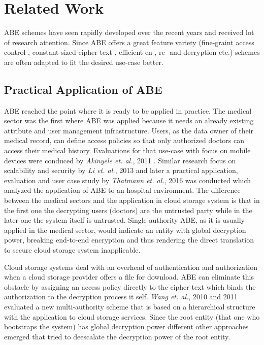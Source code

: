 \chapter{Related Work}
ABE schemes have seen rapidly developed over the recent years and received lot of research attention. Since ABE offers a great feature variety (fine-graint access control \cite{goyal2006attribute}, constant sized cipher-text \cite{li2017two}, efficient en-, re- and decryption \cite{yang2013dac} etc.) schemes are often adapted to fit the desired use-case better. 

\section{Practical Application of ABE}
ABE reached the point where it is ready to be applied in practice. The medical sector was the first where ABE was applied because it needs an already existing attribute and user management infrastructure. Users, as the data owner of their medical record, can define access policies so that only authorized doctors can access their medical history. Evaluations for that use-case with focus on mobile devices were conduced by \textit{Akinyele et. al.}, 2011 \cite{akinyele2011securing}. Similar research focus on scalability and security by \textit{Li et. al.}, 2013 \cite{li2013scalable} and later a practical application, evaluation and user case study by \textit{Thatmann et. al.}, 2016 \cite{thatmann2016please} was conducted which analyzed the application of ABE to an hospital environment. The difference between the medical sectors and the application in cloud storage system is that in the first one the decrypting users (doctors) are the untrusted party while in the later one the system itself is untrusted. Single authority ABE, as it is usually applied in the medical sector, would indicate an entity with global decryption power, breaking end-to-end encryption and thus rendering the direct translation to secure cloud storage system inapplicable.   

Cloud storage systems deal with an overhead of authentication and authorization when a cloud storage provider offers a file for download. ABE can eliminate this obstacle by assigning an access policy directly to the cipher text which binds the authorization to the decryption process it self. \textit{Wang et. al.}, 2010 \cite{Wang:2010:HAE:1866307.1866414} and 2011 \cite{wang2011hierarchical} evaluated a new multi-authority scheme that is based on a hierarchical structure with the application to cloud storage services. Since the root entity (that one who bootstraps the system) has global decryption power different other approaches emerged that tried to deescalate the decryption power of the root entity. 

